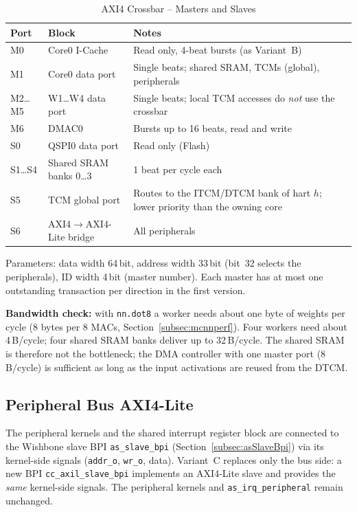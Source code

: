 \begin{table}[H]
\caption{AXI4 Crossbar -- Masters and Slaves}
\label{tab:mcnnxbar}
\centering
{\footnotesize
\begin{tabularx}{\textwidth}{|l |l |X|}
  \hline
  Port & Block & Notes \\
  \hline
  \hline
  M0 & Core0 I-Cache & Read only, 4-beat bursts (as Variant~B) \\
  \hline
  M1 & Core0 data port & Single beats; shared SRAM, TCMs (global), peripherals \\
  \hline
  M2\ldots M5 & W1\ldots W4 data port & Single beats; local TCM accesses do \emph{not} use the crossbar \\
  \hline
  M6 & DMAC0 & Bursts up to 16 beats, read and write \\
  \hline
  \hline
  S0 & QSPI0 data port & Read only (Flash) \\
  \hline
  S1\ldots S4 & Shared SRAM banks 0\ldots3 & 1 beat per cycle each \\
  \hline
  S5 & TCM global port & Routes to the ITCM/DTCM bank of hart $h$; lower priority than the owning core \\
  \hline
  S6 & AXI4$\rightarrow$AXI4-Lite bridge & All peripherals \\
  \hline
\end{tabularx}}
\end{table}

Parameters: data width 64\,bit, address width 33\,bit (bit~32 selects
the peripherals), ID width 4\,bit (master number). Each master has at most
one outstanding transaction per direction in the first version.

\textbf{Bandwidth check:} with \texttt{nn.dot8} a worker needs about one byte
of weights per cycle (8 bytes per 8 MACs, Section~\ref{subsec:mcnnperf}).
Four workers need about 4\,B/cycle; four shared SRAM banks deliver up to
32\,B/cycle. The shared SRAM is therefore not the bottleneck; the DMA
controller with one master port (8\,B/cycle) is sufficient as long as the
input activations are reused from the DTCM.

\subsection{Peripheral Bus AXI4-Lite}
\label{subsec:mcnnperbus}

The peripheral kernels and the shared interrupt register block are
connected to the Wishbone slave BPI \texttt{as\_slave\_bpi}
(Section~\ref{subsec:asSlaveBpi}) via its kernel-side signals
(\texttt{addr\_o}, \texttt{wr\_o}, data). Variant~C replaces only the bus side:
a new BPI \texttt{cc\_axil\_slave\_bpi} implements an AXI4-Lite slave and
provides the \emph{same} kernel-side signals. The peripheral kernels and
\texttt{as\_irq\_peripheral} remain unchanged.

